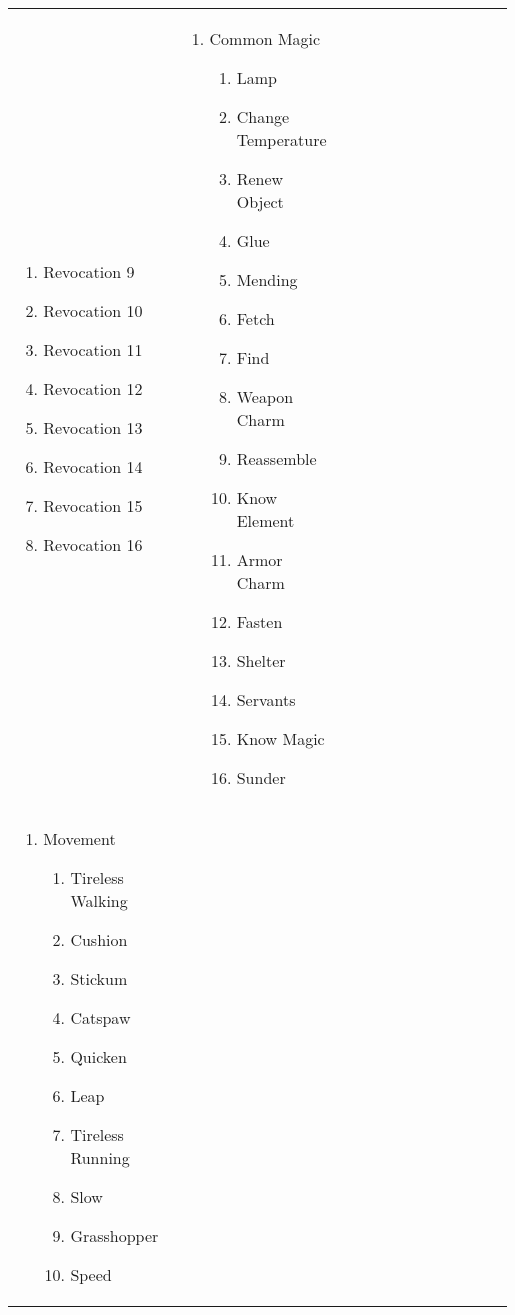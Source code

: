 \begin{tabular}{@{} p{0.33\linewidth} p{0.33\linewidth} p{0.33\linewidth}}
\begin{enumerate}
\begin{enumerate}
		\item Revocation 9
		\item Revocation 10
		\item Revocation 11
		\item Revocation 12
		\item Revocation 13
		\item Revocation 14
		\item Revocation 15
		\item Revocation 16
	\end{enumerate}
\end{enumerate} &
\begin{enumerate}
	\item Common Magic
	\begin{enumerate}
		\item Lamp
		\item Change Temperature
		\item Renew Object
		\item Glue
		\item Mending
		\item Fetch
		\item Find
		\item Weapon Charm
		\item Reassemble
		\item Know Element
		\item Armor Charm
		\item Fasten
		\item Shelter
		\item Servants
		\item Know Magic
		\item Sunder
	\end{enumerate}
\end{enumerate} \\
\begin{enumerate}
	\item Movement
	\begin{enumerate}
		\item Tireless Walking
		\item Cushion
		\item Stickum
		\item Catspaw
		\item Quicken
		\item Leap
		\item Tireless Running
		\item Slow
		\item Grasshopper
		\item Speed

\end{enumerate}
\end{enumerate}
\end{tabular}
